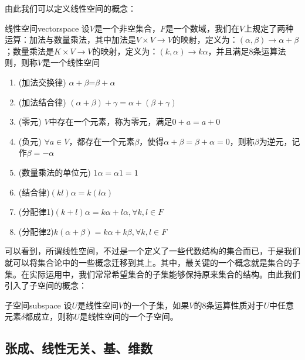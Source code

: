     由此我们可以定义线性空间的概念：
    \begin{definition}{线性空间}{vectorspace}
       设$V$是一个非空集合，$F$是一个数域，我们在$V$上规定了两种运算：加法与数量乘法，其中加法是$V\times V \rightarrow V$的映射，定义为：$(\alpha,\beta)\rightarrow \alpha+\beta $；数量乘法是$K\times V \rightarrow V$的映射，定义为：$(k,\alpha)\rightarrow k\alpha$，并且满足8条运算法则，则称$V$是一个线性空间
       \begin{enumerate}
           \item{(加法交换律)} $\alpha+\beta$=$\beta+\alpha$
           \item{(加法结合律)} $(\alpha+\beta)+\gamma=\alpha+(\beta+\gamma)$
           \item{(零元)} $V$中存在一个元素，称为零元，满足$0+a=a+0$
           \item{(负元)} $\forall a\in V$，都存在一个元素$\beta$，使得$\alpha+\beta =\beta +\alpha =0$，则称$\beta $为逆元，记作$\beta =-\alpha $
           \item{(数量乘法的单位元)} $1\alpha =\alpha 1=1$
           \item{(结合律)}$(kl)\alpha=k(l\alpha )$
           \item{(分配律1)}$(k+l)\alpha=k\alpha+l\alpha,
           \forall k,l\in F $
           \item{(分配律2)}$k(\alpha+\beta)=k\alpha+k\beta , \forall k,l\in F $
       \end{enumerate}
    \end{definition}
    
    可以看到，所谓线性空间，不过是一个定义了一些代数结构的集合而已，于是我们就可以将集合论中的一些概念迁移到其上。其中，最关键的一个概念就是集合的子集。在实际运用中，我们常常希望集合的子集能够保持原来集合的结构。由此我们引入了子空间的概念：
    \begin{definition}{子空间}{subspace}
       设$U$是线性空间$V$的一个子集，如果$V$的8条运算性质对于$U$中任意元素$\delta $都成立，则称$U$是线性空间的一个子空间。
    \end{definition}
    \subsection{张成、线性无关、基、维数}
